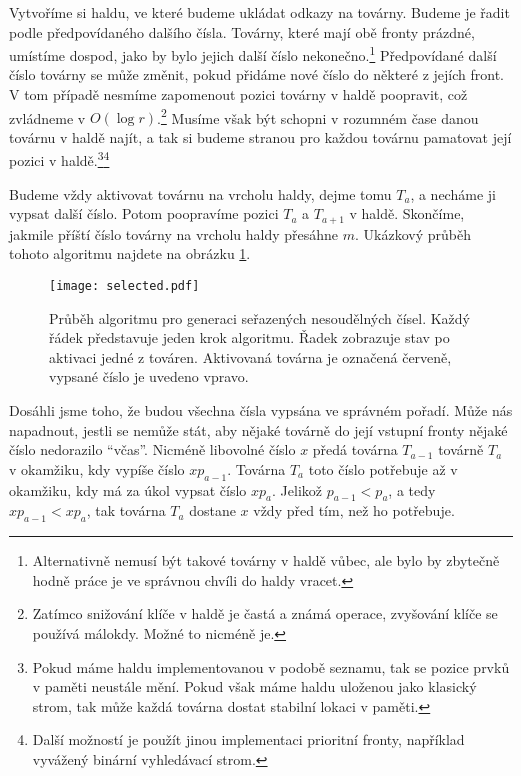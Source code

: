 \documentclass{article}
\begin{document}
Vytvoříme si haldu, ve které budeme ukládat odkazy na továrny. Budeme je řadit podle předpovídaného dalšího čísla. Továrny, které mají obě fronty prázdné, umístíme dospod, jako by bylo jejich další číslo nekonečno.\footnote{Alternativně nemusí být takové továrny v haldě vůbec, ale bylo by zbytečně hodně práce je ve správnou chvíli do haldy vracet.} Předpovídané další číslo továrny se může změnit, pokud přidáme nové číslo do některé z jejích front. V tom případě nesmíme zapomenout pozici továrny v haldě poopravit, což zvládneme v $O\left(\log{r}\right)$.\footnote{Zatímco snižování klíče v haldě je častá a známá operace, zvyšování klíče se používá málokdy. Možné to nicméně je.} Musíme však být schopni v rozumném čase danou továrnu v haldě najít, a tak si budeme stranou pro každou továrnu pamatovat její pozici v haldě.\footnote{Pokud máme haldu implementovanou v podobě seznamu, tak se pozice prvků v paměti neustále mění. Pokud však máme haldu uloženou jako klasický strom, tak může každá továrna dostat stabilní lokaci v paměti.}\footnote{Další možností je použít jinou implementaci prioritní fronty, například vyvážený binární vyhledávací strom.}

Budeme vždy aktivovat továrnu na vrcholu haldy, dejme tomu $T_a$, a necháme ji vypsat další číslo. Potom poopravíme pozici $T_a$ a $T_{a+1}$ v haldě. Skončíme, jakmile příští číslo továrny na vrcholu haldy přesáhne $m$. Ukázkový průběh tohoto algoritmu najdete na obrázku \ref{figure:selected-steps}.

\begin{figure}[hp]
    \centering
    \texttt{[image: selected.pdf]}
    \caption[Průběh algoritmu pro generaci seřazených nesoudělných čísel]{Průběh algoritmu pro generaci seřazených nesoudělných čísel. Každý řádek představuje jeden krok algoritmu. Řadek zobrazuje stav po aktivaci jedné z továren. Aktivovaná továrna je označená červeně, vypsané číslo je uvedeno vpravo.}
    \label{figure:selected-steps}
\end{figure}

Dosáhli jsme toho, že budou všechna čísla vypsána ve správném pořadí. Může nás napadnout, jestli se nemůže stát, aby nějaké továrně do její vstupní fronty nějaké číslo nedorazilo \enquote{včas}. Nicméně libovolné číslo $x$ předá továrna $T_{a-1}$ továrně $T_a$ v okamžiku, kdy vypíše číslo $x p_{a-1}$. Továrna $T_a$ toto číslo potřebuje až v okamžiku, kdy má za úkol vypsat číslo $x p_a$. Jelikož $p_{a-1} < p_{a}$, a tedy $x p_{a-1} < x p_{a}$, tak továrna $T_a$ dostane $x$ vždy před tím, než ho potřebuje.
\end{document}

